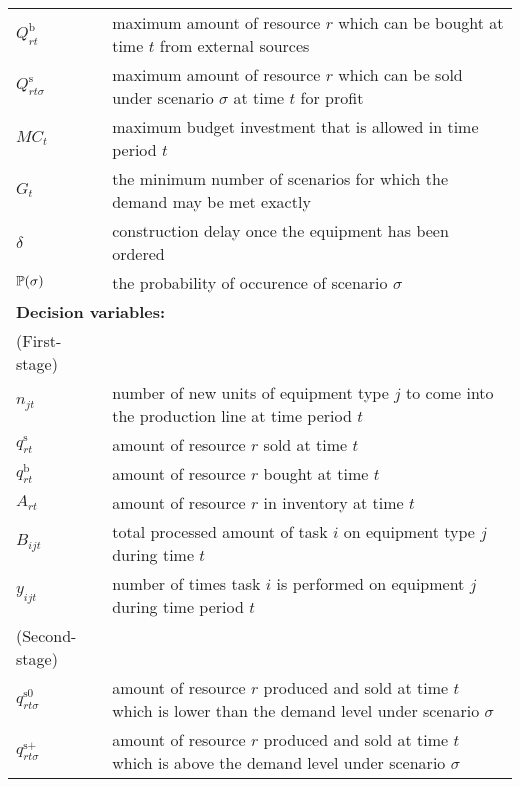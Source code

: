 \begin{table}[H]
{\begin{tabular}{ll}
			$Q_{rt}^\textrm{b}$ & maximum amount of resource $r$ which can be bought at time $t$ from external sources\\
			$Q_{rt\sigma}^\textrm{s}$ & maximum amount of resource $r$ which can be sold under scenario $\sigma$ at time $t$ for profit\\
			$MC_t$ & maximum budget investment that is allowed in time period $t$\\
			$G_t$ & the minimum number of scenarios for which the demand may be met exactly \\
			$\delta$ & construction delay once the equipment has been ordered\\	
			$\operatorname*{\mathbb{P}}(\sigma)$ & \textrm{the probability of occurence of scenario $\sigma$} \\ \midrule
			\multicolumn{2}{l}{\textbf{Decision variables:}} \\
			\textrm{(First-stage)} \nonumber\\
			$n_{jt}$ & number of new units of equipment type $j$ to come into the production line at time period $t$\\
			$q_{rt}^\textrm{s}$ & amount of resource $r$ sold at time $t$\\
			$q_{rt}^\textrm{b}$ & amount of resource $r$ bought at time $t$\\
			$A_{rt}$ & amount of resource $r$ in inventory at time $t$\\
			$B_{ijt}$ & total processed amount of task $i$ on equipment type $j$ during time $t$\\
			$y_{ijt}$ & number of times task $i$ is performed on equipment $j$ during time period $t$\\
			\textrm{(Second-stage)} \nonumber\\
			$q_{rt\sigma}^\textrm{s0}$ & amount of resource $r$ produced and sold at time $t$ which is lower than the demand level under scenario $\sigma$ \\
			$q_{rt\sigma}^\textrm{s+}$ & amount of resource $r$ produced and sold at time $t$ which is above the demand level under scenario $\sigma$ \\
			\bottomrule
		\end{tabular}
	}
\end{table} 

